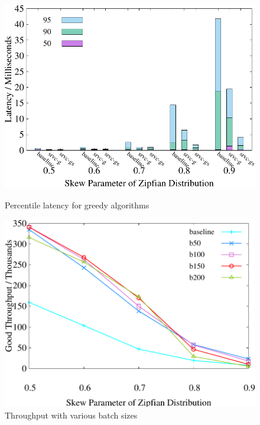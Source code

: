 \begin{figure}[t]
    \centering
    \begin{minipage}[b]{0.32\linewidth}
        \centering
        \includegraphics[width=\textwidth]{./exp_fig/fvs/percent95_latency}
        \vspace{-2em}
        \caption{Percentile latency for greedy algorithms}
        \label{fig:fvs:p95}
    \end{minipage}
    \begin{minipage}[b]{0.32\linewidth}
            \centering
            \includegraphics[width=\textwidth]{./exp_fig/bsize/tps}
            \vspace{-2em}
            \caption{Throughput with various batch sizes}

\end{minipage}
\end{figure}
